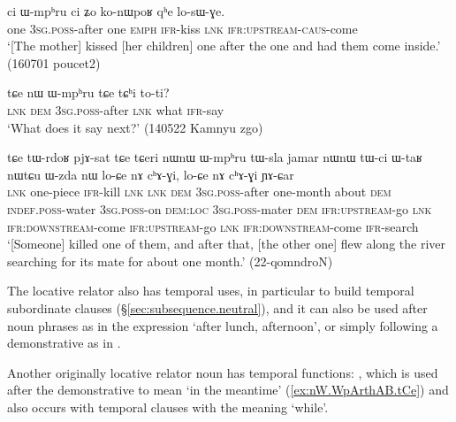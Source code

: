 \begin{exe}
\ex \label{ex:ci.Wmphru.ci}
 \gll ci ɯ-mpʰru ci ʑo ko-nɯpoʁ qʰe lo-sɯ-ɣe. \\
 one \textsc{3sg}.\textsc{poss}-after one \textsc{emph} \textsc{ifr}-kiss \textsc{lnk} \textsc{ifr}:\textsc{upstream}-\textsc{caus}-come  \\
\glt `[The mother] kissed [her children] one after the one and had them come inside.' (160701 poucet2) 
\end{exe}

\begin{exe}
\ex \label{ex:nW.Wmphru.tCe}
 \gll  tɕe nɯ ɯ-mpʰru tɕe tɕʰi to-ti? \\
 \textsc{lnk} \textsc{dem} \textsc{3sg}.\textsc{poss}-after \textsc{lnk} what \textsc{ifr}-say \\
\glt `What does it say next?' (140522 Kamnyu zgo) 
\end{exe}

\begin{exe}
\ex \label{ex:nWnW.Wmphru.tWsla}
 \gll tɕe tɯ-rdoʁ pjɤ-sat tɕe tɕeri nɯnɯ ɯ-mpʰru tɯ-sla jamar nɯnɯ tɯ-ci ɯ-taʁ nɯtɕu ɯ-zda nɯ lo-ɕe nɤ cʰɤ-ɣi, lo-ɕe nɤ cʰɤ-ɣi ɲɤ-ɕar \\
\textsc{lnk} one-piece \textsc{ifr}-kill \textsc{lnk} \textsc{lnk} \textsc{dem} \textsc{3sg}.\textsc{poss}-after one-month about \textsc{dem} \textsc{indef}.\textsc{poss}-water \textsc{3sg}.\textsc{poss}-on \textsc{dem}:\textsc{loc} \textsc{3sg}.\textsc{poss}-mater \textsc{dem} \textsc{ifr}:\textsc{upstream}-go \textsc{lnk} \textsc{ifr}:\textsc{downstream}-come  \textsc{ifr}:\textsc{upstream}-go \textsc{lnk} \textsc{ifr}:\textsc{downstream}-come \textsc{ifr}-search \\
\glt `[Someone] killed one of them, and after that, [the other one] flew along the river searching for its mate for about one month.' (22-qomndroN)
\end{exe}

The locative relator  also has temporal uses, in particular to build temporal subordinate clauses (§\ref{sec:subsequence.neutral}), and it can also be used after noun phrases as in the expression  `after lunch, afternoon', or simply following a demonstrative as in .

Another originally locative relator noun has temporal functions: , which is used after the demonstrative  to mean `in the meantime'  (\ref{ex:nW.WpArthAB.tCe}) and also occurs with temporal clauses with the meaning `while'.

